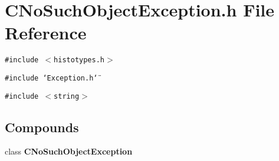 \section{CNo\-Such\-Object\-Exception.h File Reference}
\label{CNoSuchObjectException_8h}
{\tt \#include $<$histotypes.h$>$}\par
{\tt \#include \char`\"{}Exception.h\char`\"{}}\par
{\tt \#include $<$string$>$}\par
\subsection*{Compounds}
\begin{CompactItemize}
\item 
class {\bf CNo\-Such\-Object\-Exception}
\end{CompactItemize}
